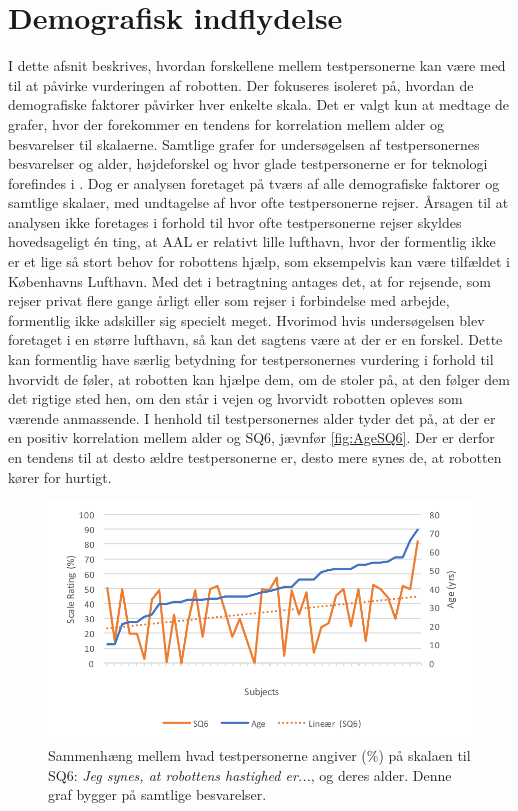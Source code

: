 \section{Demografisk indflydelse}
\label{sec:Demografi}
%
I dette afsnit beskrives, hvordan forskellene mellem testpersonerne kan være med til at påvirke vurderingen af robotten. Der fokuseres isoleret på, hvordan de demografiske faktorer påvirker hver enkelte skala. Det er valgt kun at medtage de grafer, hvor der forekommer en tendens for korrelation mellem alder og besvarelser til skalaerne. Samtlige grafer for undersøgelsen af testpersonernes besvarelser og alder, højdeforskel og hvor glade testpersonerne er for teknologi forefindes i . Dog er analysen foretaget på tværs af alle demografiske faktorer og samtlige skalaer, med undtagelse af hvor ofte testpersonerne rejser. Årsagen til at analysen ikke foretages i forhold til hvor ofte testpersonerne rejser skyldes hovedsageligt én ting, at AAL er relativt lille lufthavn, hvor der formentlig ikke er et lige så stort behov for robottens hjælp, som eksempelvis kan være tilfældet i Københavns Lufthavn. Med det i betragtning antages det, at for rejsende, som rejser privat flere gange årligt eller som rejser i forbindelse med arbejde, formentlig ikke adskiller sig specielt meget. Hvorimod hvis undersøgelsen blev foretaget i en større lufthavn, så kan det sagtens være at der er en forskel. Dette kan formentlig have særlig betydning for testpersonernes vurdering i forhold til hvorvidt de føler, at robotten kan hjælpe dem, om de stoler på, at den følger dem det rigtige sted hen, om den står i vejen og hvorvidt robotten opleves som værende anmassende.\blankline
% 
I henhold til testpersonernes alder tyder det på, at der er en positiv korrelation mellem alder og SQ6, jævnfør \autoref{fig:AgeSQ6}. Der er derfor en tendens til at desto ældre testpersonerne er, desto mere synes de, at robotten kører for hurtigt. 
%
\begin{figure}[H]
\centering
\includegraphics[width=\textwidth]{Figure/DatabehandlingSkalaer/Demografi/AgeSQ6}
\caption{Sammenhæng mellem hvad testpersonerne angiver (\%) på skalaen til SQ6: \textit{Jeg synes, at robottens hastighed er...}, og deres alder. Denne graf bygger på samtlige besvarelser.}
\label{fig:AgeSQ6}
\end{figure}

